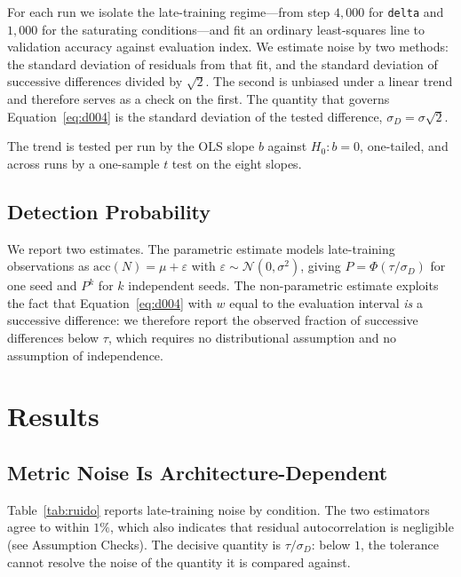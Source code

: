 \documentclass[jou,11pt,donotrepeattitle]{apa7}
\begin{document}
For each run we isolate the late-training regime---from step $4{,}000$ for \texttt{delta} and
$1{,}000$ for the saturating conditions---and fit an ordinary least-squares line to validation
accuracy against evaluation index. We estimate noise by two methods: the standard deviation of
residuals from that fit, and the standard deviation of successive differences divided by
$\sqrt{2}$. The second is unbiased under a linear trend and therefore serves as a check on the
first. The quantity that governs Equation~\ref{eq:d004} is the standard deviation of the tested
difference, $\sigma_D = \sigma\sqrt{2}$.

The trend is tested per run by the OLS slope $b$ against $H_0\colon b = 0$, one-tailed, and
across runs by a one-sample $t$ test on the eight slopes.

\subsection{Detection Probability}

We report two estimates. The parametric estimate models late-training observations as
$\mathrm{acc}(N) = \mu + \varepsilon$ with $\varepsilon \sim \mathcal{N}(0, \sigma^2)$, giving
$P = \Phi(\tau / \sigma_D)$ for one seed and $P^{k}$ for $k$ independent seeds. The
non-parametric estimate exploits the fact that Equation~\ref{eq:d004} with $w$ equal to the
evaluation interval \emph{is} a successive difference: we therefore report the observed fraction
of successive differences below $\tau$, which requires no distributional assumption and no
assumption of independence.

\section{Results}

\subsection{Metric Noise Is Architecture-Dependent}

Table~\ref{tab:ruido} reports late-training noise by condition. The two estimators agree to
within $1\%$, which also indicates that residual autocorrelation is negligible
(see Assumption Checks). The decisive quantity is $\tau / \sigma_D$: below $1$, the tolerance
cannot resolve the noise of the quantity it is compared against.
\end{document}
